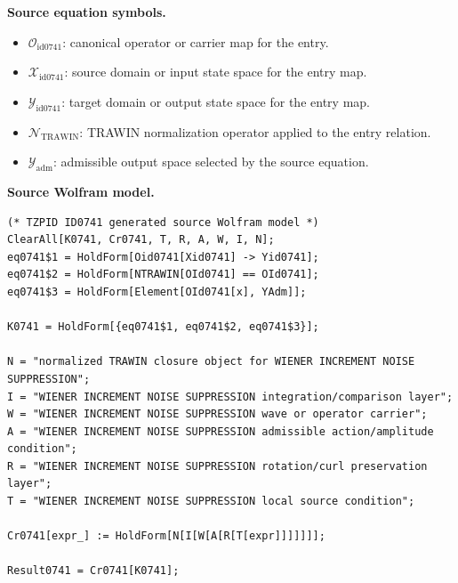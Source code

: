 \begin{minipage}[t]{0.49\linewidth}
\begingroup
\small
\raggedright
\textbf{Source equation symbols.}\par
\begin{itemize}[leftmargin=1.35em,itemsep=1pt,topsep=1pt,parsep=0pt]
    \item $\mathcal{O}_{\mathrm{id0741}}$: canonical operator or carrier map for the entry.
    \item $\mathcal{X}_{\mathrm{id0741}}$: source domain or input state space for the entry map.
    \item $\mathcal{Y}_{\mathrm{id0741}}$: target domain or output state space for the entry map.
    \item $\mathcal{N}_{\mathrm{TRAWIN}}$: TRAWIN normalization operator applied to the entry relation.
    \item $\mathcal{Y}_{\mathrm{adm}}$: admissible output space selected by the source equation.
\end{itemize}
\endgroup
\end{minipage}\hfill
\begin{minipage}[t]{0.47\linewidth}
\begingroup
\scriptsize
\raggedright
\textbf{Source Wolfram model.}\par
\begin{Verbatim}[fontsize=\tiny,breaklines=true,breakanywhere=true]
(* TZPID ID0741 generated source Wolfram model *)
ClearAll[K0741, Cr0741, T, R, A, W, I, N];
eq0741$1 = HoldForm[Oid0741[Xid0741] -> Yid0741];
eq0741$2 = HoldForm[NTRAWIN[OId0741] == OId0741];
eq0741$3 = HoldForm[Element[OId0741[x], YAdm]];

K0741 = HoldForm[{eq0741$1, eq0741$2, eq0741$3}];

N = "normalized TRAWIN closure object for WIENER INCREMENT NOISE SUPPRESSION";
I = "WIENER INCREMENT NOISE SUPPRESSION integration/comparison layer";
W = "WIENER INCREMENT NOISE SUPPRESSION wave or operator carrier";
A = "WIENER INCREMENT NOISE SUPPRESSION admissible action/amplitude condition";
R = "WIENER INCREMENT NOISE SUPPRESSION rotation/curl preservation layer";
T = "WIENER INCREMENT NOISE SUPPRESSION local source condition";

Cr0741[expr_] := HoldForm[N[I[W[A[R[T[expr]]]]]]];

Result0741 = Cr0741[K0741];
\end{Verbatim}
\endgroup
\end{minipage}

